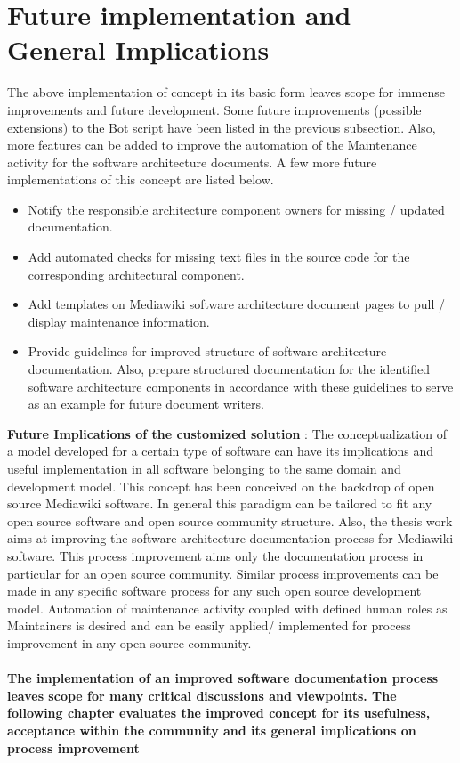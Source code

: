\section{Future implementation and General Implications }
The above implementation of concept in its basic form leaves scope for immense improvements and future development. Some future improvements (possible extensions) to the Bot script have been listed in the previous subsection. Also, more features can be added to improve the automation of the Maintenance activity for the software architecture documents.
\newline A few more future implementations of this concept are listed below.
\begin{itemize}
\item Notify the responsible architecture component owners for missing / updated documentation.
\item Add automated checks for missing text files in the source code for the corresponding architectural component. 
\item Add templates on Mediawiki software architecture document pages to pull / display maintenance information.
\item Provide guidelines for improved structure of software architecture documentation.
Also, prepare structured documentation for the identified software architecture components in accordance with these guidelines to serve as an example for future document writers.
\end{itemize}

\textbf{Future Implications of the customized solution} : 
\newline The conceptualization of a model developed for a certain type of software can have its implications and useful implementation in all software belonging to the same domain and development model.
\newline This concept has been conceived on the backdrop of open source Mediawiki software. In general this paradigm can be tailored to fit any open source software and open source community structure. Also, the thesis work aims at improving the software architecture documentation process for Mediawiki software. 
\newline This process improvement aims only the documentation process in particular for an open source community. Similar process improvements can be made in any specific software process for any such open source development model. Automation of maintenance activity coupled with defined human roles as Maintainers is desired and can be easily applied/ implemented for process improvement in any open source community.

\paragraph{The implementation of an improved software documentation process leaves scope for many critical discussions and viewpoints. The following chapter evaluates the improved concept for its usefulness, acceptance within the community and its general implications on process improvement}